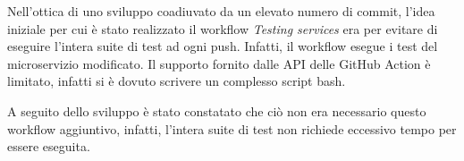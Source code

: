 Nell'ottica di uno sviluppo coadiuvato da un elevato numero di commit, l'idea iniziale per cui è stato realizzato il workflow \emph{Testing services} era per evitare di eseguire l'intera suite di test ad ogni push.
%
Infatti, il workflow esegue i test del microservizio modificato.
%
Il supporto fornito dalle API delle GitHub Action è limitato, infatti si è dovuto scrivere un complesso script bash.

A seguito dello sviluppo è stato constatato che ciò non era necessario questo workflow aggiuntivo, infatti, l'intera suite di test non richiede eccessivo tempo per essere eseguita.
